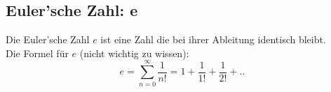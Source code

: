 \subsection{Euler'sche Zahl: e}
Die Euler'sche Zahl $e$ ist eine Zahl die bei ihrer Ableitung identisch bleibt. \\
Die Formel für $e$ (nicht wichtig zu wissen): 
\[
e = \sum_{n=0}^{\infty} \frac{1}{n!} = 1 + \frac{1}{1!} + \frac{1}{2!} + ..
\]

